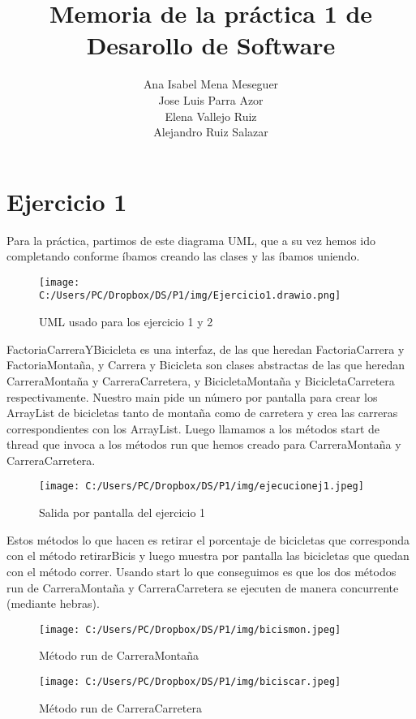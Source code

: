 \documentclass{article}
\title{Memoria de la práctica 1 de Desarollo de Software}
\author{Ana Isabel Mena Meseguer \\ Jose Luis Parra Azor\\ Elena Vallejo Ruiz \\ Alejandro Ruiz Salazar}
\date{}
\begin{document}
\maketitle
\section{Ejercicio 1}
Para la práctica, partimos de este diagrama UML, que a su vez hemos ido completando conforme íbamos creando las clases y las íbamos uniendo. 
\begin{figure}[H]
\centering
\texttt{[image: C:/Users/PC/Dropbox/DS/P1/img/Ejercicio1.drawio.png]}
\caption{UML usado para los ejercicio 1 y 2}
\end{figure}
FactoriaCarreraYBicicleta es una interfaz, de las que heredan FactoriaCarrera y FactoriaMontaña, y Carrera y Bicicleta son clases abstractas de las que heredan CarreraMontaña y CarreraCarretera, y BicicletaMontaña y BicicletaCarretera respectivamente. 
Nuestro main pide un número por pantalla para crear los ArrayList de bicicletas tanto de montaña como de carretera y crea las carreras correspondientes con los ArrayList. Luego llamamos a los métodos start de thread que invoca a los métodos run que hemos creado para CarreraMontaña y CarreraCarretera. 
\begin{figure}[H]
\centering
\texttt{[image: C:/Users/PC/Dropbox/DS/P1/img/ejecucionej1.jpeg]}
\caption{Salida por pantalla del ejercicio 1}
\end{figure}
Estos métodos lo que hacen es retirar el porcentaje de bicicletas que corresponda con el método retirarBicis y luego muestra por pantalla las bicicletas que quedan con el método correr. Usando start lo que conseguimos es que los dos métodos run de CarreraMontaña y CarreraCarretera se ejecuten de manera concurrente (mediante hebras).
\begin{figure}[H]
\centering
\texttt{[image: C:/Users/PC/Dropbox/DS/P1/img/bicismon.jpeg]}
\caption{Método run de CarreraMontaña}
\end{figure}
\begin{figure}[H]
\centering
\texttt{[image: C:/Users/PC/Dropbox/DS/P1/img/biciscar.jpeg]}
\caption{Método run de CarreraCarretera}
\end{figure}
\end{document}
